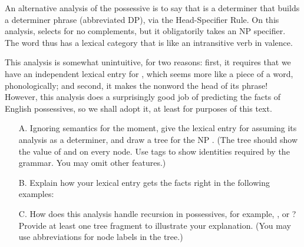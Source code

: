 \documentclass[a4paper,landscape,headrule,footrule]{foils}
\begin{document}

An  alternative analysis of the possessive is to say that %
is a
 determiner that builds a  determiner phrase (abbreviated DP),
via the Head-Specifier Rule. 
On this
analysis,   selects for no complements, but it obligatorily
takes an NP  specifier. The word  thus has a lexical category
that is like an intransitive verb in valence.

This analysis is somewhat unintuitive, for two reasons:  first, it
requires that we have an independent lexical entry for , which
seems more like a piece of a word, phonologically;  and second, it makes
the nonword  the head of its phrase!  However, this analysis
does a surprisingly good job of predicting the facts of English
 possessives, so we shall adopt it, at least for purposes of
this text.

\begin{itemize}
\item[A.] Ignoring semantics for the moment, give the lexical entry for
 assuming its analysis as a  determiner, and draw 
a tree 
for the NP . 
(The tree should show the value of  and  on every
node.  Use tags to show identities required by the grammar.
You may omit other features.)

\item[B.] Explain how your lexical entry gets the facts right in the 
following examples:
\begin{exe}
\ex {}
\ex {}
\end{exe}

\item[C.] How does this analysis handle recursion in possessives, 
for example, , or ?  Provide at least one tree %
fragment
to illustrate your
explanation.
(You may use abbreviations for node labels in the tree.)
\end{itemize}
\end{document}
